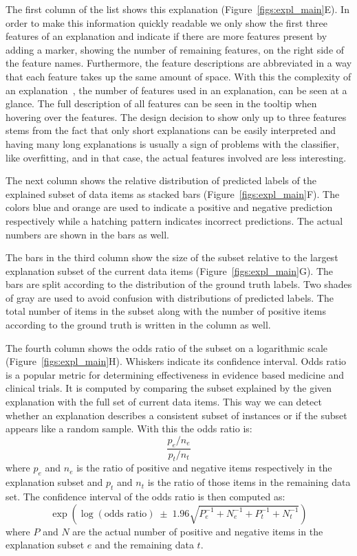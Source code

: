 The first column of the list shows this explanation (Figure~\ref{figs:expl_main}E).
In order to make this information quickly readable we only show the first three features of an explanation and indicate if there are more features present by adding a marker, showing the number of remaining features, on the right side of the feature names.
Furthermore, the feature descriptions are abbreviated in a way that each feature takes up the same amount of space.
With this the complexity of an explanation~\ie, the number of features used in an explanation, can be seen at a glance.
The full description of all features can be seen in the tooltip when hovering over the features.
The design decision to show only up to three features stems from the fact that only short explanations can be easily interpreted and having many long explanations is usually a sign of problems with the classifier, like overfitting, and in that case, the actual features involved are less interesting.

The next column shows the relative distribution of predicted labels of the explained subset of data items as stacked bars (Figure~\ref{figs:expl_main}F).
The colors blue and orange are used to indicate a positive and negative prediction respectively while a hatching pattern indicates incorrect predictions.
The actual numbers are shown in the bars as well.



The bars in the third column show the size of the subset relative to the largest explanation subset of the current data items (Figure~\ref{figs:expl_main}G).
The bars are split according to the distribution of the ground truth labels.
Two shades of gray are used to avoid confusion with distributions of predicted labels.
The total number of items in the subset along with the number of positive items according to the ground truth is written in the column as well.



The fourth column shows the odds ratio of the subset on a logarithmic scale (Figure~\ref{figs:expl_main}H).
Whiskers indicate its confidence interval.
Odds ratio is a popular metric for determining effectiveness in evidence based medicine and clinical trials.
It is computed by comparing the subset explained by the given explanation with the full set of current data items.
This way we can detect whether an explanation describes a consistent subset of instances or if the subset appears like a random sample.
With this the odds ratio is:
\[
\frac{p_e / n_e}{p_t / n_t}
\]
where $p_e$ and $n_e$ is the ratio of positive and negative items respectively in the explanation subset and $p_t$ and $n_t$ is the ratio of those items in the remaining data set.
The confidence interval of the odds ratio is then computed as:
\[
\exp{\left(\log{(\text{odds ratio})} \; \pm \; 1.96 \sqrt{P_e^{-1} + N_e^{-1} + P_t^{-1} + N_t^{-1}}\right)}
\]
where $P$ and $N$ are the actual number of positive and negative items in the explanation subset $e$ and the remaining data $t$.

